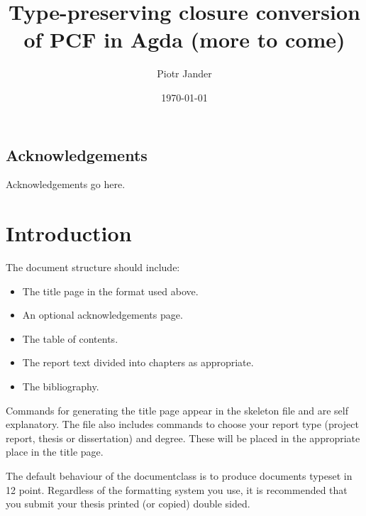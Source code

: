\documentclass[bsc,frontabs,twoside,singlespacing,parskip,deptreport]{infthesis}
\theoremstyle{definition}
\begin{document}
\title{Type-preserving closure conversion of PCF in Agda (more to come)}

\author{Piotr Jander}


\date{\today}


\maketitle

\section*{Acknowledgements}
Acknowledgements go here.

\tableofcontents



\chapter{Introduction}

The document structure should include:
\begin{itemize}
\item
The title page  in the format used above.
\item
An optional acknowledgements page.
\item
The table of contents.
\item
The report text divided into chapters as appropriate.
\item
The bibliography.
\end{itemize}

Commands for generating the title page appear in the skeleton file and
are self explanatory.
The file also includes commands to choose your report type (project
report, thesis or dissertation) and degree.
These will be placed in the appropriate place in the title page.

The default behaviour of the documentclass is to produce documents typeset in
12 point.  Regardless of the formatting system you use,
it is recommended that you submit your thesis printed (or copied)
double sided.
\end{document}
